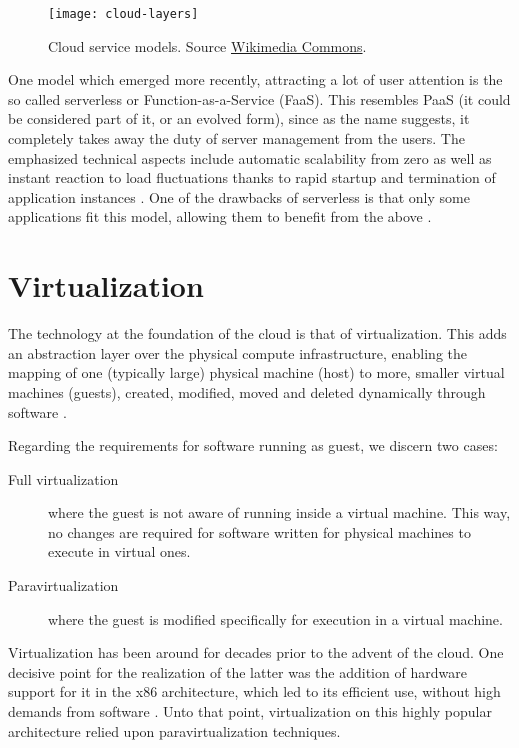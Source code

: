 \begin{figure}
    \centering
    \texttt{[image: cloud-layers]}
    \caption[Cloud service models]{Cloud service models. Source
        \href{https://commons.wikimedia.org/wiki/File:Cloud_computing_layers.svg}{Wikimedia Commons}.}
    \label{fig:cloud}
\end{figure}

One model which emerged more recently, attracting a lot of user attention is
the so called serverless or Function-as-a-Service (FaaS). This resembles PaaS
(it could be considered part of it, or an evolved form), since as the name
suggests, it completely takes away the duty of server management from the users.
The emphasized technical aspects include automatic scalability from zero as well
as instant reaction to load fluctuations thanks to rapid startup and termination
of application instances \cite{cloudflare-serverless}. One of the drawbacks of
serverless is that only some applications fit this model, allowing them to
benefit from the above \cite{serverless, spec-serverless}.

\section{Virtualization}

The technology at the foundation of the cloud is that of virtualization. This
adds an abstraction layer over the physical compute infrastructure, enabling
the mapping of one (typically large) physical machine (host) to more, smaller
virtual machines (guests), created, modified, moved and deleted dynamically
through software \cite{wiki:hw-virtualization}.

Regarding the requirements for software running as guest, we discern two cases:
\begin{description}
    \item[Full virtualization] where the guest is not aware of running inside a
          virtual machine. This way, no changes are required for software
          written for physical machines to execute in virtual ones.
    \item[Paravirtualization] where the guest is modified specifically for
          execution in a virtual machine.
\end{description}
Virtualization has been around for decades prior to the advent of the cloud. One
decisive point for the realization of the latter was the addition of hardware
support for it in the x86 architecture, which led to its efficient use, without
high demands from software \cite{virtualization-x86}. Unto that point,
virtualization on this highly popular architecture relied upon
paravirtualization techniques.

